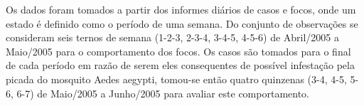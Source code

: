 \begin{figure}[!ht]
	\centering
\end{figure}

Os dados foram tomados a partir dos informes diários de casos e focos, onde um estado é definido como o período de uma semana. Do conjunto de observações se consideram seis ternos de semana (1-2-3, 2-3-4, 3-4-5, 4-5-6) de Abril/2005 a Maio/2005 para o comportamento dos focos. Os casos são tomados para o final de cada período em razão de serem eles consequentes de possível infestação pela picada do mosquito Aedes aegypti, tomou-se então quatro quinzenas (3-4, 4-5, 5-6, 6-7) de Maio/2005 a Junho/2005 para avaliar este comportamento.

\pagebreak

